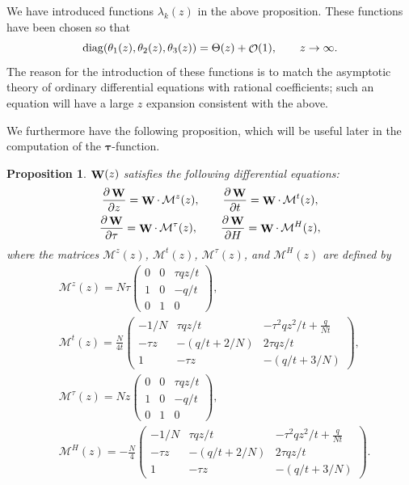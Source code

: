 \documentclass[pdftex]{sigma}
\DeclareMathOperator{\OO}{\mathcal{O}}
\DeclareMathOperator{\WW}{{\bf W}}
\numberwithin{equation}{section}
\newtheorem{Proposition}[Theorem]{Proposition}
 { \theoremstyle{definition}
\newtheorem{Definition}[Theorem]{Definition}
\newtheorem{Note}[Theorem]{Note}
\newtheorem{Example}[Theorem]{Example}
\newtheorem{Remark}[Theorem]{Remark} }
\begin{document}
\begin{Remark}
 We have introduced functions $\lambda_k(z)$ in the above proposition. These functions have been chosen so that
 \begin{equation*}
 {\rm diag}(\theta_1(z),\theta_2(z),\theta_3(z)) = \Theta(z) + \OO(1), \qquad z\to \infty.
 \end{equation*}
 The reason for the introduction of these functions is to match the asymptotic theory of ordinary differential equations with rational coefficients; such an
 equation will have a large $z$ expansion consistent with the above.
\end{Remark}
We furthermore have the following proposition, which will be useful later in the computation of the $\boldsymbol{\tau}$-function.
\begin{Proposition}
 $\WW(z)$ satisfies the following differential equations:
 \begin{gather}\label{W-differentials}
 \frac{\partial \WW}{\partial z} = \WW\cdot\, \mathcal{M}^{z}(z),\qquad \frac{\partial \WW}{\partial t} = \WW\cdot\, \mathcal{M}^{t}(z), \nonumber\\
 \frac{\partial \WW}{\partial \tau} = \WW\cdot\, \mathcal{M}^{\tau}(z), \qquad \frac{\partial \WW}{\partial H} = \WW\cdot\, \mathcal{M}^{H}(z),
 \end{gather}
 where the matrices $\mathcal{M}^{z}(z)$, $\mathcal{M}^{t}(z)$, $\mathcal{M}^{\tau}(z)$, and $\mathcal{M}^{H}(z)$ are defined by
 \begin{align*}
 &\mathcal{M}^{z}(z)=
 N\tau
 \begin{pmatrix}
 0 & 0 & \tau q z/t\\
 1 & 0 & -q/t\\
 0 & 1 & 0
 \end{pmatrix},\\
 &\mathcal{M}^{t}(z)=
 \frac{N}{4t}
 \begin{pmatrix}
 -1/N & \tau q z/t & -\tau^2 q z^2/t + \frac{q}{Nt}\\
 -\tau z & -(q/t+2/N) & 2\tau q z/t\\
 1 & -\tau z & -(q/t + 3/N)
 \end{pmatrix},\\
 &\mathcal{M}^{\tau}(z)=
 Nz\begin{pmatrix}
 0 & 0 & \tau q z/t\\
 1 & 0 & -q/t\\
 0 & 1 & 0
 \end{pmatrix},\\
 &\mathcal{M}^{H}(z)=
 -\frac{N}{4}
 \begin{pmatrix}
 -1/N & \tau qz/t & -\tau^2 q z^2/t + \frac{q}{Nt}\\
 -\tau z & -(q/t+2/N) & 2\tau q z/t\\
 1 & -\tau z & -(q/t + 3/N)
 \end{pmatrix}.
 \end{align*}
\end{Proposition}
\end{document}
